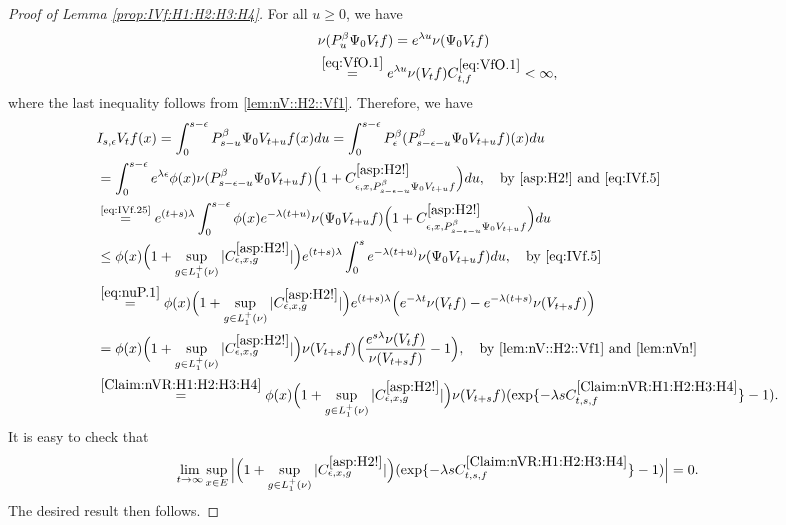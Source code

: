 \documentclass[12pt,a4paper]{amsart}
\numberwithin{equation}{section}
\theoremstyle{plain}
\theoremstyle{definition}
\theoremstyle{remark}
\begin{document}
\begin{proof}[Proof of Lemma \ref{prop:IVf:H1:H2:H3:H4}]
	For all $u\geq 0$, we have
\begin{align} \label{eq:IVf.25}
	&\nu(P_u^\beta \Psi_0 V_t f) = e^{\lambda u}\nu(\Psi_0 V_t f)
	\\&\overset{\eqref{eq:VfO.1}}=e^{\lambda u}\nu(V_tf) C^{\eqref{eq:VfO.1}}_{t,f}
	< \infty, \label{eq:IVf.5}
\end{align}
	where the last inequality follows from \eqref{lem:nV::H2::Vf1}.
	Therefore, we have
\begin{align}
 	& I_{s,\epsilon} V_t f(x)
 	= \int_0^{s- \epsilon} P_{s-u}^\beta \Psi_0 V_{t+u} f (x) du
 	= \int_0^{s- \epsilon} P_\epsilon^\beta (P_{s - \epsilon - u}^\beta \Psi_0 V_{t+u} f )(x) du
 	\\&= \int_0^{s - \epsilon} e^{\lambda \epsilon} \phi(x) \nu(P_{s - \epsilon - u}^{\beta} \Psi_0 V_{t+u} f)  \Big(1+C^{\eqref{asp:H2!}}_{\epsilon ,x , P_{s - \epsilon - u}^{\beta} \Psi_0 V_{t+u} f}\Big) du ,\quad\text{by \eqref{asp:H2!} and \eqref{eq:IVf.5}}
	\\&\overset{\text{\eqref{eq:IVf.25}}}= e^{(t+s)\lambda} \int_0^{s - \epsilon} \phi(x) e^{-\lambda (t+u)}\nu(\Psi_0 V_{t+u} f)  \Big(1+C^{\eqref{asp:H2!}}_{\epsilon ,x , P_{s - \epsilon - u}^{\beta} \Psi_0 V_{t+u} f}\Big) du
	\\&\leq \phi(x) \Big(1+\sup_{g\in L_1^+(\nu)}|C^{\eqref{asp:H2!}}_{\epsilon ,x , g}|\Big) e^{(t+s)\lambda} \int_0^{s} e^{-\lambda (t+u)} \nu(\Psi_0 V_{t+u}f)du,\quad\text{by \eqref{eq:IVf.5}}
 	\\&\overset{\eqref{eq:nuP.1}}= \phi(x) \Big(1+\sup_{g\in L_1^+(\nu)}|C^{\eqref{asp:H2!}}_{\epsilon ,x , g}|\Big)  e^{(t+s)\lambda} \Big(e^{-\lambda t}\nu(V_tf)- e^{-\lambda(t+s)}\nu(V_{t+s}f)\Big)
 	\\&= \phi(x) \Big(1+\sup_{g\in L_1^+(\nu)}|C^{\eqref{asp:H2!}}_{\epsilon ,x , g}|\Big) \nu(V_{t+s}f) \Big( \frac{e^{s \lambda }\nu(V_tf)}{\nu(V_{t+s}f)} - 1\Big),\quad \text{by \eqref{lem:nV::H2::Vf1} and \eqref{lem:nVn!}}
 	\\&\overset{\eqref{Claim:nVR:H1:H2:H3:H4}}= \phi(x) \Big(1+\sup_{g\in L_1^+(\nu)}|C^{\eqref{asp:H2!}}_{\epsilon ,x , g}|\Big) \nu(V_{t+s}f) ( \exp\{- \lambda s C^{\eqref{Claim:nVR:H1:H2:H3:H4}}_{t,s,f}\} - 1).
\end{align}
	It is easy to check that
\begin{equation}
	\lim_{t\to \infty}\sup_{x\in E}\Big|\Big(1+\sup_{g\in L_1^+(\nu)}|C^{\eqref{asp:H2!}}_{\epsilon ,x , g}|\Big)( \exp\{- \lambda s C^{\eqref{Claim:nVR:H1:H2:H3:H4}}_{t,s,f}\} - 1) \Big| = 0.
\end{equation}
	The desired result then follows.
\end{proof}
\end{document}
